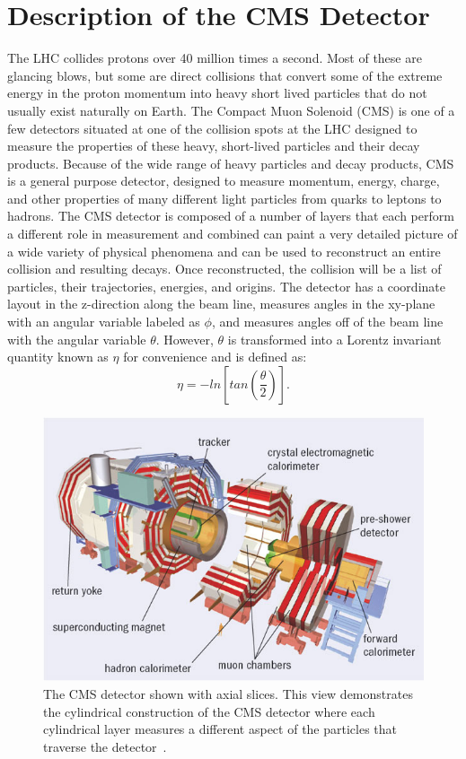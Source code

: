 	\section{Description of the CMS Detector}        
		The LHC collides protons over 40 million times a second. Most of these are glancing blows, but some are direct collisions that convert some of the extreme energy in the proton momentum into heavy short lived particles that do not usually exist naturally on Earth. The Compact Muon Solenoid (CMS) is one of a few detectors situated at one of the collision spots at the LHC designed to measure the properties of these heavy, short-lived particles and their decay products. Because of the wide range of heavy particles and decay products, CMS is a general purpose detector, designed to measure momentum, energy, charge, and other properties of many different light particles from quarks to leptons to hadrons. The CMS detector is composed of a number of layers that each perform a different role in measurement and combined can paint a very detailed picture of a wide variety of physical phenomena and can be used to reconstruct an entire collision and resulting decays. Once reconstructed, the collision will be a list of particles, their trajectories, energies, and origins. The detector has a coordinate layout in the z-direction along the beam line, measures angles in the xy-plane with an angular variable labeled as $\phi$, and measures angles off of the beam line with the angular variable $\theta$. However, $\theta$ is transformed into a Lorentz invariant quantity known as $\eta$ for convenience and is defined as:
\begin{equation}
\eta = -ln \left[ tan \left( \frac{\theta}{2} \right) \right].
\end{equation}
		
\begin{figure}[h]
\begin{center}
\includegraphics[width=0.9\linewidth]{Figs/cms_detector_internal_clear.jpg}
\caption{\label{fig:cms_internal}
The CMS detector shown with axial slices. This view demonstrates the cylindrical construction of the CMS detector where each cylindrical layer measures a different aspect of the particles that traverse the detector~\cite{cmspic}.
}
\end{center}
\end{figure} 

